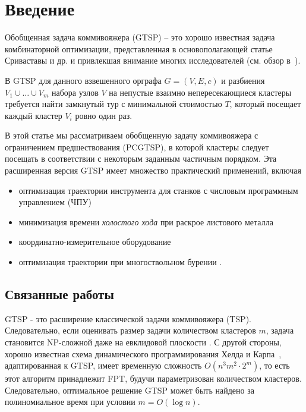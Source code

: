 \section{Введение}\label{sec:intro}
Обобщенная задача коммивояжера (GTSP) --
это хорошо известная задача комбинаторной оптимизации,
представленная в основополагающей статье \cite{SKGS1969}
Сриваставы и др. и привлекшая внимание многих исследователей
(см. обзор в~\cite{GutinPunnen2007}).

В GTSP для данного взвешенного орграфа
$ G = (V, E, c) $
и разбиения $ V_1 \cup \ldots \cup V_m $ набора узлов $ V $
на непустые взаимно непересекающиеся кластеры требуется найти замкнутый тур с минимальной стоимостью $ T $,
который посещает каждый кластер $ V_i $ ровно один раз.

В этой статье мы рассматриваем обобщенную задачу коммивояжера
с ограничением предшествования (PCGTSP),
в которой кластеры следует посещать в соответствии с некоторым заданным частичным порядком.
Эта расширенная версия GTSP имеет множество практический применений, включая
\begin{itemize}
	\item
	оптимизация траектории инструмента для станков с числовым программным управлением (ЧПУ)
	\cite{CASTELINO2003173}
	\item
	минимизация времени {\it холостого хода} при раскрое листового металла
	\cite{Petunin2018, Makarovskikh20181171}
	\item
	координатно-измерительное оборудование
	\cite{SALMAN2016138}
	\item
	оптимизация траектории при многоствольном бурении
	\cite{DEWIL2019}.
\end{itemize}

\subsection{Связанные работы}
GTSP - это расширение классической задачи коммивояжера (TSP).
Следовательно, если оценивать размер задачи количеством кластеров
$ m $,
задача становится NP-сложной даже на евклидовой плоскости \cite{Papa77}.
С другой стороны,
хорошо известная схема динамического программирования Хелда и Карпа~\cite{HeldKarp1962},
адаптированная к GTSP,
имеет временную сложность
$ O (n ^ 3m ^ 2 \cdot 2 ^ m) $,
то есть этот алгоритм принадлежит FPT,
будучи параметризован количеством кластеров.
Следовательно,
оптимальное решение
GTSP может быть найдено за полиномиальное время при условии
$ m = O (\log n) $.

